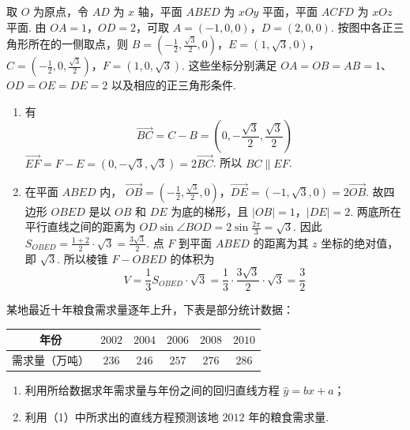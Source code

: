 \begin{solution}
取 \(O\) 为原点，令 \(AD\) 为 \(x\) 轴，平面 \(ABED\) 为 \(xOy\) 平面，平面 \(ACFD\) 为 \(xOz\) 平面. 由 \(OA=1\)，\(OD=2\)，可取 \(A=(-1,0,0)\)，\(D=(2,0,0)\). 按图中各正三角形所在的一侧取点，则 \(B=\left(-\frac12,\frac{\sqrt3}{2},0\right)\)，\(E=(1,\sqrt3,0)\)，\(C=\left(-\frac12,0,\frac{\sqrt3}{2}\right)\)，\(F=(1,0,\sqrt3)\).
这些坐标分别满足 \(OA=OB=AB=1\)、\(OD=OE=DE=2\) 以及相应的正三角形条件.

\begin{enumerate}
\item 有
\[
\overrightarrow{BC}=C-B=\left(0,-\frac{\sqrt3}{2},\frac{\sqrt3}{2}\right)
\]
\(\overrightarrow{EF}=F-E=(0,-\sqrt3,\sqrt3)=2\overrightarrow{BC}\).
所以 \(BC\parallel EF\).

\item 在平面 \(ABED\) 内，
\(\overrightarrow{OB}=\left(-\frac12,\frac{\sqrt3}{2},0\right)\)，\(\overrightarrow{DE}=(-1,\sqrt3,0)=2\overrightarrow{OB}\). 故四边形 \(OBED\) 是以 \(OB\) 和 \(DE\) 为底的梯形，且 \(|OB|=1\)，\(|DE|=2\). 两底所在平行直线之间的距离为 \(OD\sin\angle BOD=2\sin\frac{2\pi}{3}=\sqrt3\). 因此 \(S_{OBED}=\frac{1+2}{2}\cdot\sqrt3=\frac{3\sqrt3}{2}\).
点 \(F\) 到平面 \(ABED\) 的距离为其 \(z\) 坐标的绝对值，即 \(\sqrt3\). 所以棱锥 \(F-OBED\) 的体积为
\[
V=\frac13S_{OBED}\cdot\sqrt3
=\frac13\cdot\frac{3\sqrt3}{2}\cdot\sqrt3=\frac32
\]
\end{enumerate}
\end{solution}

\begin{problem}
某地最近十年粮食需求量逐年上升，下表是部分统计数据：

\begin{center}
\begin{tabular}{c|ccccc}
年份 & \(2002\) & \(2004\) & \(2006\) & \(2008\) & \(2010\) \\
\hline
需求量（\(\text{万吨}\)） & \(236\) & \(246\) & \(257\) & \(276\) & \(286\)
\end{tabular}
\end{center}

\begin{enumerate}
\item 利用所给数据求年需求量与年份之间的回归直线方程 \(\hat{y} = bx + a\)；
\item 利用（1）中所求出的直线方程预测该地 \(2012\) 年的粮食需求量.
\end{enumerate}
\end{problem}

